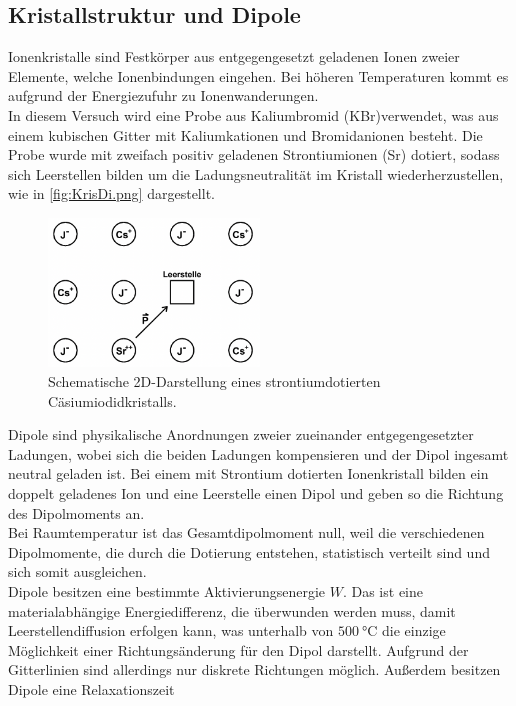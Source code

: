 \subsection{Kristallstruktur und Dipole}
\label{subsec:KriDi}
Ionenkristalle sind Festkörper aus entgegengesetzt geladenen Ionen zweier Elemente, welche Ionenbindungen eingehen.
Bei höheren Temperaturen kommt es aufgrund der Energiezufuhr zu Ionenwanderungen.\\
In diesem Versuch wird eine Probe aus Kaliumbromid (KBr)verwendet, was aus einem kubischen Gitter
mit Kaliumkationen und Bromidanionen besteht. Die Probe wurde mit zweifach positiv geladenen Strontiumionen (Sr) dotiert, sodass sich
Leerstellen bilden um die Ladungsneutralität im Kristall wiederherzustellen, wie in \autoref{fig:KrisDi.png} dargestellt.
\begin{figure}[H]
    \centering
    \includegraphics[width=0.5\textwidth]{Abbildungen/KrisDi.png}
    \caption {Schematische 2D-Darstellung eines strontiumdotierten Cäsiumiodidkristalls.\cite{V48alt}}
    \label{fig:KrisDi.png}
\end{figure}
Dipole sind physikalische Anordnungen zweier zueinander entgegengesetzter Ladungen, wobei sich die beiden Ladungen
kompensieren und der Dipol ingesamt neutral geladen ist.
Bei einem mit Strontium dotierten Ionenkristall bilden ein doppelt geladenes Ion und eine Leerstelle einen Dipol und geben so die 
Richtung des Dipolmoments an.\\
Bei Raumtemperatur ist das Gesamtdipolmoment null, weil die verschiedenen Dipolmomente, die durch die Dotierung 
entstehen, statistisch verteilt sind und sich somit ausgleichen.\\
Dipole besitzen eine bestimmte Aktivierungsenergie $W$. Das ist eine materialabhängige Energiedifferenz, die 
überwunden werden muss, damit Leerstellendiffusion erfolgen kann, was unterhalb von $\qty{500}{\celsius}$ die einzige Möglichkeit
einer Richtungsänderung für den Dipol darstellt.
Aufgrund der Gitterlinien sind allerdings nur diskrete Richtungen möglich.
Außerdem besitzen Dipole eine Relaxationszeit
